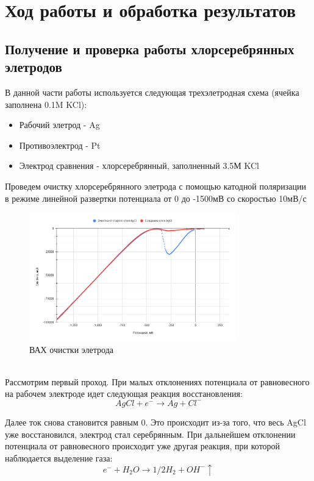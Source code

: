 \documentclass[a4paper,12pt]{article}
\begin{document}
\newpage
\section{Ход работы и обработка результатов}
\subsection{Получение и проверка работы хлорсеребрянных элетродов}
В данной части работы используется следующая трехэлетродная схема (ячейка заполнена 0.1M KCl):
\begin{itemize}
    \item Рабочий элетрод - Ag
    \item Противоэлектрод - Pt
    \item Электрод сравнения - хлорсеребрянный, заполненный 3.5М KCl
\end{itemize}
Проведем очистку хлорсеребрянного элетрода с помощью катодной поляризации в режиме линейной развертки потенциала от 0 до -1500мВ со скоростью 10мВ/с
\begin{figure}[h!]
    \centering
    \includegraphics[width = 0.8\textwidth]{cleaning.png}
    \caption{ВАХ очистки элетрода}
    \label{fig:no_int}
\end{figure}\\
Рассмотрим первый проход. При малых отклонениях потенциала от равновесного на рабочем электроде идет следующая реакция восстановления:
\begin{equation*}
AgCl + e^- \rightarrow Ag + Cl^-
\end{equation*}

Далее ток снова становится равным 0. Это происходит из-за того, что весь AgCl уже восстановился, электрод стал серебрянным. При дальнейшем отклонении потенциала от равновесного происходит уже другая реакция, при которой наблюдается выделение газа:
\begin{equation*}
    e^{-}+ H_{2}O \rightarrow 1/2H_2 + OH^{-}\uparrow
\end{equation*}
\end{document}
